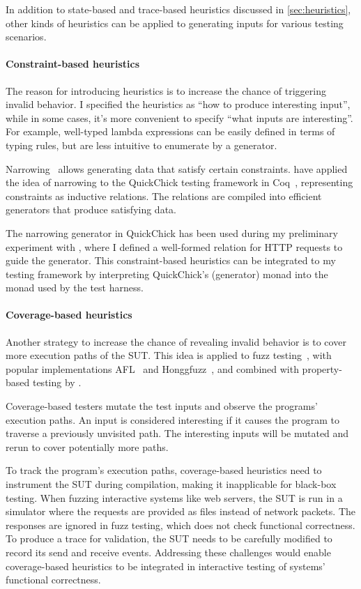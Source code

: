 In addition to state-based and trace-based heuristics discussed in
\autoref{sec:heuristics}, other kinds of heuristics can be applied to generating
inputs for various testing scenarios.

\paragraph{Constraint-based heuristics}
The reason for introducing heuristics is to increase the chance of triggering
invalid behavior.  I specified the heuristics as ``how to produce interesting
input'', while in some cases, it's more convenient to specify ``what inputs are
interesting''.  For example, well-typed lambda expressions can be easily defined
in terms of typing rules, but are less intuitive to enumerate by a generator.

Narrowing~\cite{narrowing} allows generating data that satisfy certain
constraints.  \citet{gengood} have applied the idea of narrowing to the
QuickChick testing framework in Coq~\cite{quickchick}, representing constraints
as inductive relations.  The relations are compiled into efficient generators
that produce satisfying data.

The narrowing generator in QuickChick has been used during my preliminary
experiment with \http, where I defined a well-formed relation for HTTP requests
to guide the generator.  This constraint-based heuristics can be integrated to
my testing framework by interpreting QuickChick's  (generator) monad
into the  monad used by the test harness.

\paragraph{Coverage-based heuristics}
Another strategy to increase the chance of revealing invalid behavior is to
cover more execution paths of the SUT.  This idea is applied to fuzz
testing~\cite{fuzz}, with popular implementations AFL~\cite{afl} and
Honggfuzz~\cite{honggfuzz}, and combined with property-based testing by
\citet{fuzzchick}.

Coverage-based testers mutate the test inputs and observe the programs'
execution paths.  An input is considered interesting if it causes the program to
traverse a previously unvisited path.  The interesting inputs will be mutated
and rerun to cover potentially more paths.

To track the program's execution paths, coverage-based heuristics need to
instrument the SUT during compilation, making it inapplicable for black-box
testing.  When fuzzing interactive systems like web servers, the SUT is run in a
simulator where the requests are provided as files instead of network packets.
The responses are ignored in fuzz testing, which does not check functional
correctness.  To produce a trace for validation, the SUT needs to be carefully
modified to record its send and receive events.  Addressing these challenges
would enable coverage-based heuristics to be integrated in interactive testing
of systems' functional correctness.

